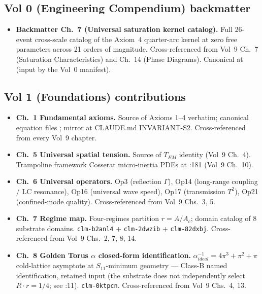 \subsection{Vol 0 (Engineering Compendium) backmatter}

\begin{itemize}
    \item \textbf{Backmatter Ch.~7 (Universal saturation kernel catalog).} Full 26-event cross-scale catalog of the Axiom~4 quarter-arc kernel at zero free parameters across 21 orders of magnitude. Cross-referenced from Vol~9 Ch.~7 (Saturation Characteristics) and Ch.~14 (Phase Diagrams). Canonical at  (input by the Vol~0 manifest).
\end{itemize}

\subsection{Vol 1 (Foundations) contributions}

\begin{itemize}
    \item \textbf{Ch.~1 Fundamental axioms.} Source of Axioms 1--4 verbatim; canonical equation files ; mirror at CLAUDE.md INVARIANT-S2. Cross-referenced from every Vol~9 chapter.
    \item \textbf{Ch.~5 Universal spatial tension.} Source of $T_{EM}$ identity (Vol~9 Ch.~4). Trampoline framework Cosserat micro-inertia PDEs at :181 (Vol~9 Ch.~10).
    \item \textbf{Ch.~6 Universal operators.} Op3 (reflection $\Gamma$), Op14 (long-range coupling / LC resonance), Op16 (universal wave speed), Op17 (transmission $T^2$), Op21 (confined-mode quality). Cross-referenced from Vol~9 Chs.~3, 5.
    \item \textbf{Ch.~7 Regime map.} Four-regimes partition $r = A/A_c$; domain catalog of 8 substrate domains. \texttt{clm-b2anl4} + \texttt{clm-2dwzib} + \texttt{clm-82dxbj}. Cross-referenced from Vol~9 Chs.~2, 7, 8, 14.
    \item \textbf{Ch.~8 Golden Torus $\alpha$ closed-form identification.} $\alpha^{-1}_{ideal} = 4\pi^3 + \pi^2 + \pi$ cold-lattice asymptote at $S_{11}$-minimum geometry --- Class-B named identification, retained input (the substrate does not independently select $R\cdot r = 1/4$; see :11). \texttt{clm-0ktpcn}. Cross-referenced from Vol~9 Chs.~4, 13.
\end{itemize}

